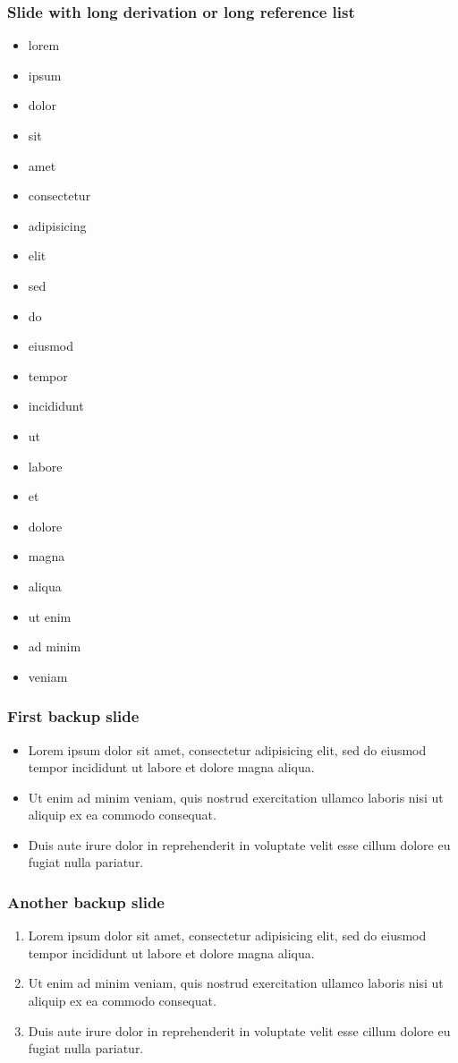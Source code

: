 \documentclass[11pt,xcolor={dvipsnames},hyperref={pdftex,pdfpagemode=UseNone,hidelinks,pdfdisplaydoctitle=true},usepdftitle=false]{beamer}
\begin{document}
\begin{frame}[allowframebreaks=0.8]
\frametitle{Slide with long derivation or long reference list}
\begin{itemize}
\item lorem 
\item ipsum 
\item dolor 
\item sit 
\item amet
\item consectetur 
\item adipisicing 
\item elit
\item sed
\item do
\item eiusmod
\item tempor
\item incididunt
\item ut
\item labore
\item et 
\item dolore 
\item magna 
\item aliqua
\item ut enim
\item ad minim 
\item veniam
\end{itemize}
\end{frame}

\fi
\lastslide

\begin{frame}[label=backupSlide]
\frametitle{First backup slide}
\begin{itemize}
\item Lorem ipsum dolor sit amet, consectetur adipisicing elit, sed do eiusmod
tempor incididunt ut labore et dolore magna aliqua.
\item  Ut enim ad minim veniam, quis nostrud exercitation ullamco laboris nisi ut aliquip ex ea commodo consequat. 
\item Duis aute irure dolor in reprehenderit in voluptate velit esse
cillum dolore eu fugiat nulla pariatur. 
\end{itemize}
\hyperlink{firstSlide}{}
\end{frame}

\begin{frame}[label=anotherBackupSlide]
\frametitle{Another backup slide}
\begin{enumerate}
\item Lorem ipsum dolor sit amet, consectetur adipisicing elit, sed do eiusmod
tempor incididunt ut labore et dolore magna aliqua.
\item  Ut enim ad minim veniam, quis nostrud exercitation ullamco laboris nisi ut aliquip ex ea commodo consequat. 
\item Duis aute irure dolor in reprehenderit in voluptate velit esse
cillum dolore eu fugiat nulla pariatur. 
\end{enumerate}
\hyperlink{firstSlide}{}
\end{frame}
\end{document}
